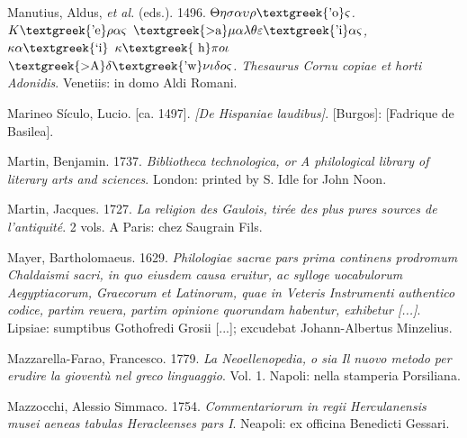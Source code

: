 \begin{styleStandard}
Manutius, Aldus, \textit{et al.} (eds.). 1496. \textit{$\Theta \eta \sigma \alpha \upsilon \rho \text{\textgreek{'o}}\varsigma $. $K\text{\textgreek{'e}}\rho \alpha \varsigma $ $\text{\textgreek{>a}}\mu \alpha \lambda \theta \varepsilon \text{\textgreek{'i}}\alpha \varsigma $, $\kappa \alpha \text{\textgreek{`i}}$ $\kappa \text{\textgreek{~h}}\pi o\iota $ $\text{\textgreek{>A}}\delta \text{\textgreek{'w}}\nu \iota \delta o\varsigma $. Thesaurus Cornu copiae et horti Adonidis}. Venetiis: in domo Aldi Romani.
\end{styleStandard}

\begin{styleStandard}
Marineo Sículo, Lucio. [ca. 1497]. \textit{[De Hispaniae laudibus]}. [Burgos]: [Fadrique de Basilea].
\end{styleStandard}

\begin{styleStandard}
Martin, Benjamin. 1737. \textit{Bibliotheca technologica, or A philological library of literary arts and sciences}. London: printed by S. Idle for John Noon.
\end{styleStandard}

\begin{styleStandard}
Martin, Jacques. 1727. \textit{La religion des Gaulois, tirée des plus pures sources de l’antiquité}. 2 vols. A Paris: chez Saugrain Fils.
\end{styleStandard}

\begin{styleStandard}
Mayer, Bartholomaeus. 1629. \textit{Philologiae sacrae pars prima continens prodromum Chaldaismi sacri, in quo eiusdem causa eruitur, ac sylloge uocabulorum Aegyptiacorum, Graecorum et Latinorum, quae in Veteris Instrumenti authentico codice, partim reuera, partim opinione quorundam habentur, exhibetur [...]}. Lipsiae: sumptibus Gothofredi Grosii [...]; excudebat Johann-Albertus Minzelius.
\end{styleStandard}

\begin{styleStandard}
Mazzarella-Farao, Francesco. 1779. \textit{La Neoellenopedia, o sia Il nuovo metodo per erudire la gioventù nel greco linguaggio}. Vol. 1. Napoli: nella stamperia Porsiliana.
\end{styleStandard}

\begin{styleStandard}
Mazzocchi, Alessio Simmaco. 1754. \textit{Commentariorum in regii Herculanensis musei aeneas tabulas Heracleenses pars I}. Neapoli: ex officina Benedicti Gessari.
\end{styleStandard}

